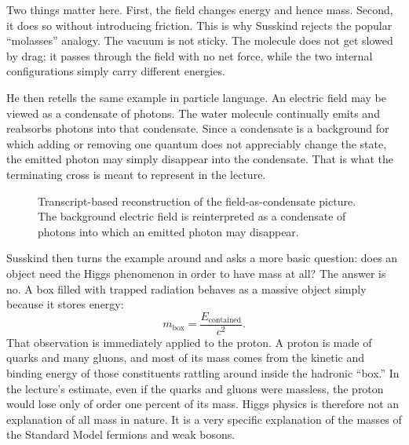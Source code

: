 Two things matter here. First, the field changes energy and hence mass. Second, it does so without introducing friction. This is why Susskind rejects the popular ``molasses'' analogy. The vacuum is not sticky. The molecule does not get slowed by drag; it passes through the field with no net force, while the two internal configurations simply carry different energies.

He then retells the same example in particle language. An electric field may be viewed as a condensate of photons. The water molecule continually emits and reabsorbs photons into that condensate. Since a condensate is a background for which adding or removing one quantum does not appreciably change the state, the emitted photon may simply disappear into the condensate. That is what the terminating cross is meant to represent in the lecture.

\begin{figure}
\centering
{}
\caption{Transcript-based reconstruction of the field-as-condensate picture. The background electric field is reinterpreted as a condensate of photons into which an emitted photon may disappear.}
\end{figure}

Susskind then turns the example around and asks a more basic question: does an object need the Higgs phenomenon in order to have mass at all? The answer is no. A box filled with trapped radiation behaves as a massive object simply because it stores energy:
\begin{equation}
m_{\text{box}}=\frac{E_{\text{contained}}}{c^{2}}.
\end{equation}
That observation is immediately applied to the proton. A proton is made of quarks and many gluons, and most of its mass comes from the kinetic and binding energy of those constituents rattling around inside the hadronic ``box.'' In the lecture's estimate, even if the quarks and gluons were massless, the proton would lose only of order one percent of its mass. Higgs physics is therefore not an explanation of all mass in nature. It is a very specific explanation of the masses of the Standard Model fermions and weak bosons.

